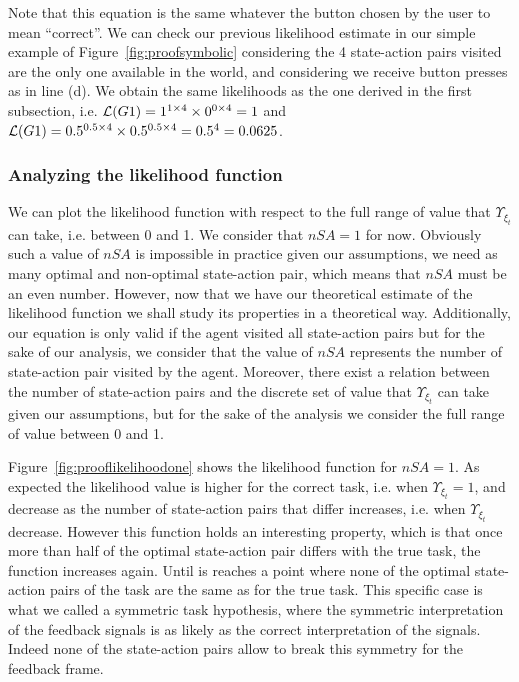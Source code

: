 

Note that this equation is the same whatever the button chosen by the user to mean ``correct''. We can check our previous likelihood estimate in our simple example of Figure~\ref{fig:proofsymbolic} considering the 4 state-action pairs visited are the only one available in the world, and considering we receive button presses as in line (d). We obtain the same likelihoods as the one derived in the first subsection, i.e. $\mathcal{L}(G1) = 1^{1\times4} \times 0^{0\times4} = 1$ and $\mathcal{L}(G1) = 0.5^{0.5\times4} \times 0.5^{0.5\times4} = 0.5^4 = 0.0625$.

\subsubsection*{Analyzing the likelihood function}

We can plot the likelihood function with respect to the full range of value that $\Upsilon_{\xi_t}$ can take, i.e. between 0 and 1. We consider that $nSA = 1$ for now. Obviously such a value of $nSA$ is impossible in practice given our assumptions, we need as many optimal and non-optimal state-action pair, which means that $nSA$ must be an even number. However, now that we have our theoretical estimate of the likelihood function we shall study its properties in a theoretical way. Additionally, our equation is only valid if the agent visited all state-action pairs but for the sake of our analysis, we consider that the value of $nSA$ represents the number of state-action pair visited by the agent. Moreover, there exist a relation between the number of state-action pairs and the discrete set of value that $\Upsilon_{\xi_t}$ can take given our assumptions, but for the sake of the analysis we consider the full range of value between 0 and 1.

Figure~\ref{fig:prooflikelihoodone} shows the likelihood function for $nSA = 1$. As expected the likelihood value is higher for the correct task, i.e. when $\Upsilon_{\xi_t} = 1$, and decrease as the number of state-action pairs that differ increases, i.e. when $\Upsilon_{\xi_t}$ decrease. However this function holds an interesting property, which is that once more than half of the optimal state-action pair differs with the true task, the function increases again. Until is reaches a point where none of the optimal state-action pairs of the task are the same as for the true task. This specific case is what we called a symmetric task hypothesis, where the symmetric interpretation of the feedback signals is as likely as the correct interpretation of the signals. Indeed none of the state-action pairs allow to break this symmetry for the feedback frame. 

